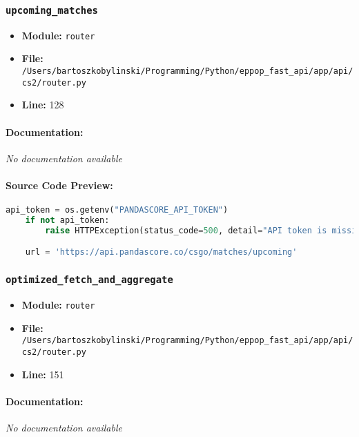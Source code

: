 \documentclass[11pt,a4paper]{article}
\begin{document}
\vspace{1em}
\subsubsection{\texttt{upcoming\_matches}}

\begin{itemize}
    \item \textbf{Module:} \texttt{router}
    \item \textbf{File:} \texttt{/Users/bartoszkobylinski/Programming/Python/eppop\_fast\_api/app/api/cs2/router.py}
    \item \textbf{Line:} 128
\end{itemize}

\paragraph{Documentation:} \textit{No documentation available}

\paragraph{Source Code Preview:}
\begin{lstlisting}[language=Python]
    api_token = os.getenv("PANDASCORE_API_TOKEN")
    if not api_token:
        raise HTTPException(status_code=500, detail="API token is missing")

    url = 'https://api.pandascore.co/csgo/matches/upcoming'
\end{lstlisting}

\vspace{1em}
\subsubsection{\texttt{optimized\_fetch\_and\_aggregate}}

\begin{itemize}
    \item \textbf{Module:} \texttt{router}
    \item \textbf{File:} \texttt{/Users/bartoszkobylinski/Programming/Python/eppop\_fast\_api/app/api/cs2/router.py}
    \item \textbf{Line:} 151
\end{itemize}

\paragraph{Documentation:} \textit{No documentation available}
\end{document}
